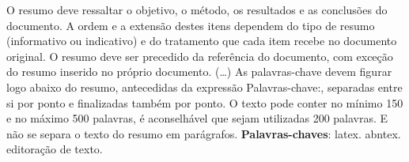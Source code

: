 \begin{resumo}
O resumo deve ressaltar o objetivo, o método, os resultados e as conclusões
do documento. A ordem e a extensão
destes itens dependem do tipo de resumo (informativo ou indicativo) e do
tratamento que cada item recebe no documento original. O resumo deve ser
precedido da referência do documento, com exceção do resumo inserido no
próprio documento. (\ldots) As palavras-chave devem figurar logo abaixo do
resumo, antecedidas da expressão Palavras-chave:, separadas entre si por
ponto e finalizadas também por ponto. O texto pode conter no mínimo 150 e
no máximo 500 palavras, é aconselhável que sejam utilizadas 200 palavras.
E não se separa o texto do resumo em parágrafos.
\vspace{\onelineskip}
\noindent
\textbf{Palavras-chaves}: latex. abntex. editoração de texto.
\end{resumo}